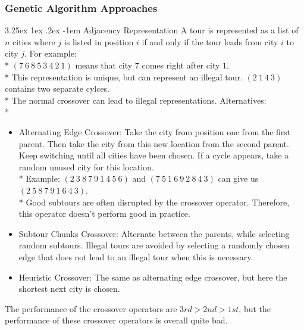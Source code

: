 \documentclass[12pt]{article}
\makeatletter
\newcounter{subsubsubsection}[subsubsection]
\renewcommand\paragraph{\@startsection{paragraph}{5}{\z@}%
  {3.25ex \@plus1ex \@minus.2ex}%
  {-1em}%
  {\normalfont\normalsize\bfseries}}
\makeatother
\begin{document}
\subsubsection{Genetic Algorithm Approaches}
\paragraph{Adjacency Representation}
A tour is represented as a list of $n$ cities where $j$ is listed in position $i$ if and only if the tour leads from city $i$ to city $j$. For example:\\*
$(7\ 6\ 8\ 5\ 3\ 4\ 2\ 1)$ means that city $7$ comes right after city $1$.\\*
This representation is unique, but can represent an illegal tour. $(2\ 1\ 4\ 3)$ contains two separate cylces.\\*
The normal crossover can lead to illegal representations. Alternatives:\\*
\begin{itemize}
\item Alternating Edge Crossover: Take the city from position one from the first parent. Then take the city from this new location from the second parent. Keep switching until all cities have been chosen. If a cycle appears, take a random unused city for this location.\\*
Example: $(2\ 3\ 8\ 7\ 9\ 1\ 4\ 5\ 6)$ and $(7\ 5\ 1\ 6\ 9\ 2\ 8\ 4\ 3)$ can give us $(2\ 5\ 8\ 7\ 9\ 1\ 6\ 4\ 3)$.\\*
Good subtours are often disrupted by the crossover operator. Therefore, this operator doesn't perform good in practice.
\item Subtour Chunks Crossover: Alternate between the parents, while selecting random subtours. Illegal tours are avoided by selecting a randomly chosen edge that does not lead to an illegal tour when this is necessary.
\item Heuristic Crossover: The same as alternating edge crossover, but here the shortest next city is chosen.
\end{itemize}
The performance of the crossover operators are $3rd > 2nd > 1st$, but the performance of these crossover operators is overall quite bad.\\
\end{document}
